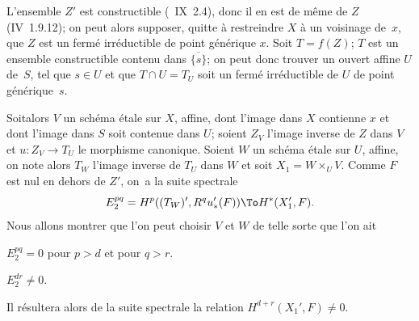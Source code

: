 L'ensemble $Z'$ est constructible (~IX~2.4), donc il en est de m\^eme de $Z$ (\EGA IV~1.9.12); on peut alors supposer, quitte \`a restreindre $X$ \`a un voisinage de~$x$, que $Z$ est un ferm\'e irr\'eductible de point g\'en\'erique $x$. Soit $T=f(Z)$; $T$ est un ensemble constructible contenu dans $\overline{\{s\}}$; on peut donc trouver un ouvert affine $U$ de~$S$, tel que $s \in U$ et que $T \cap U = T_U$ soit un ferm\'e irr\'eductible de $U$ de point g\'en\'erique~$s$.

Soit\pageoriginale alors $V$ un sch\'ema \'etale sur $X$, affine, dont l'image dans $X$ contienne $x$ et dont l'image dans $S$ soit contenue dans $U$; soient $Z_V$ l'image inverse de $Z$ dans $V$ et $u: Z_V \to T_U$ le morphisme canonique. Soient $W$ un sch\'ema \'etale sur $U$, affine, on note alors $T_W$ l'image inverse de $T_U$ dans $W$ et soit $X_1 = W\times_U V$. Comme $F$ est nul en dehors de $Z'$, on~a la suite spectrale
$$
E^{pq}_2 = H^p((T_W)', R^qu_*'(F)) \To H^*(X'_1, F).
$$
Nous allons montrer que l'on peut choisir $V$ et $W$ de telle sorte que l'on ait
\begin{enumeratea}
\item
$E^{pq}_2=0$ pour $p>d$ et pour $q>r$.
\item
$E^{dr}_2 \neq 0$.
\end{enumeratea}
\noindent
Il r\'esultera alors de la suite spectrale la relation $H^{d+r}(X_1', F) \neq 0$.
